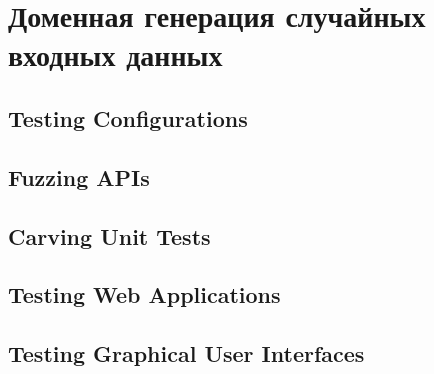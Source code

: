 \section{Доменная генерация случайных входных данных} \label{section_4}

\subsection{Testing Configurations}


\subsection{Fuzzing APIs}


\subsection{Carving Unit Tests}


\subsection{Testing Web Applications}


\subsection{Testing Graphical User Interfaces}

